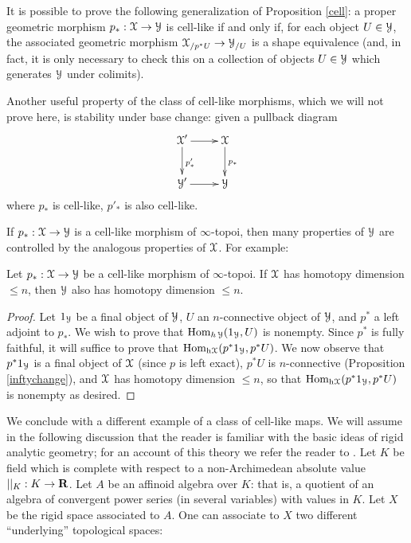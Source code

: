 \begin{remark}
It is possible to prove the following generalization of Proposition \ref{cell}: a proper geometric morphism $p_{\ast}: \operatorname{\mathcal{X}} \rightarrow \operatorname{\mathcal{Y}}$ is cell-like if and only if, for each
object $U \in \operatorname{\mathcal{Y}}$, the associated geometric morphism
$\operatorname{\mathcal{X}}_{/p^{\ast} U} \rightarrow \operatorname{\mathcal{Y}}_{/U}$ is a shape equivalence (and, in fact, it is only necessary to check this on a collection of objects $U \in \operatorname{\mathcal{Y}}$ which generates $\operatorname{\mathcal{Y}}$ under colimits). 
\end{remark}

\begin{remark}
Another useful property of the class of cell-like morphisms, which we will not prove here, is stability under base change: given a pullback diagram
$$ \xymatrix{ \calX' \ar[d]^{p'_{\ast}} \ar[r] & \calX \ar[d]^{p_{\ast}} \\
\calY' \ar[r] & \calY }$$
where $p_{\ast}$ is cell-like, $p'_{\ast}$ is also cell-like.
\end{remark}

If $p_{\ast}: \operatorname{\mathcal{X}} \rightarrow \operatorname{\mathcal{Y}}$ is a cell-like morphism of $\infty$-topoi, then many properties of $\operatorname{\mathcal{Y}}$ are controlled by the analogous properties of $\operatorname{\mathcal{X}}$. For example:

\begin{proposition}
Let $p_{\ast}: \operatorname{\mathcal{X}} \rightarrow \operatorname{\mathcal{Y}}$ be a cell-like morphism of $\infty$-topoi. If
$\operatorname{\mathcal{X}}$ has homotopy dimension $\leq n$, then $\operatorname{\mathcal{Y}}$ also has homotopy dimension $\leq n$.
\end{proposition}

\begin{proof}
Let $1_{\operatorname{\mathcal{Y}}}$ be a final object of $\operatorname{\mathcal{Y}}$, $U$ an $n$-connective object of $\operatorname{\mathcal{Y}}$, and
$p^{\ast}$ a left adjoint to $p_{\ast}$. We wish to prove that $\operatorname{Hom}_{h \operatorname{\mathcal{Y}}}(1_{\operatorname{\mathcal{Y}}},U)$ is nonempty. Since $p^{\ast}$ is fully faithful, it will suffice to prove that
$\operatorname{Hom}_{\rm{h} \it{\operatorname{\mathcal{X}}}}( p^{\ast} 1_{\operatorname{\mathcal{Y}}}, p^{\ast} U)$. We now observe that $p^{\ast} 1_{\operatorname{\mathcal{Y}}}$ is a final object of $\operatorname{\mathcal{X}}$ (since $p$ is left exact), $p^{\ast}U$ is $n$-connective (Proposition \ref{inftychange}), and $\operatorname{\mathcal{X}}$ has homotopy dimension $\leq n$, so that
$\operatorname{Hom}_{\rm{h} \it{\operatorname{\mathcal{X}}}}( p^{\ast} 1_{\operatorname{\mathcal{Y}}}, p^{\ast} U)$ is nonempty as desired.
\end{proof}

We conclude with a different example of a class of cell-like maps. We will assume in the following discussion that the reader is familiar with the basic ideas of rigid analytic geometry; for an account of this theory we refer the reader to \cite{rigidgeom}. Let
$K$ be field which is complete with respect to a non-Archimedean absolute value
$||_K: K \rightarrow \operatorname{\mathbf{R}}$. Let $A$ be an affinoid algebra over $K$: that is, a quotient of an algebra of convergent power series (in several variables) with values in $K$. Let $X$ be
the rigid space associated to $A$. One can associate to $X$ two different ``underlying'' topological spaces:

